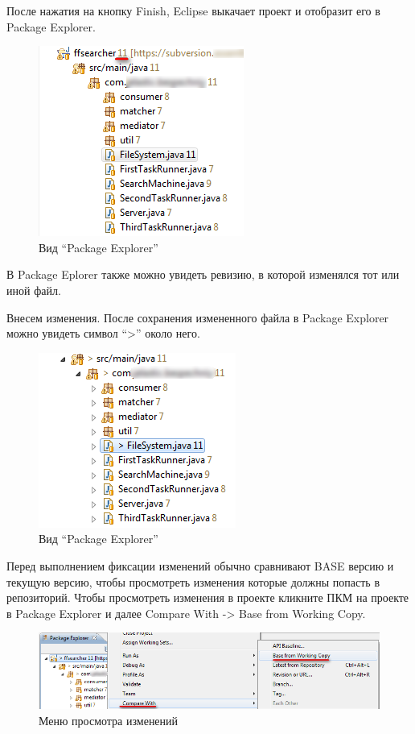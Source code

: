 \documentclass[a4paper,12pt]{article}
\begin{document}
После нажатия на кнопку Finish, Eclipse выкачает проект и отобразит его
в Package Explorer.

\begin{figure}[h!]
	\centering
	\includegraphics[scale=1]{eclipse-2.png}
	\vspace{-10pt}
	\caption{Вид ``Package Explorer''}
\end{figure}

В Package Eplorer также можно увидеть ревизию, в которой изменялся тот
или иной файл.

Внесем изменения. После сохранения измененного файла в Package Explorer
можно увидеть символ ``\textgreater{}'' около него.

\begin{figure}[h!]
	\centering
	\includegraphics[scale=0.90]{eclipse-3.png}
	\vspace{-10pt}
	\caption{Вид ``Package Explorer''}
\end{figure}

Перед выполнением фиксации изменений обычно сравнивают BASE версию и
текущую версию, чтобы просмотреть изменения которые должны попасть в
репозиторий. Чтобы просмотреть изменения в проекте кликните ПКМ на
проекте в Package Explorer и далее Compare With -\textgreater{} Base
from Working Copy.

\begin{figure}[h!]
	\centering
	\includegraphics[scale=0.80]{eclipse-diff-1.png}
	\vspace{-10pt}
	\caption{Меню просмотра изменений}
\end{figure}
\end{document}
